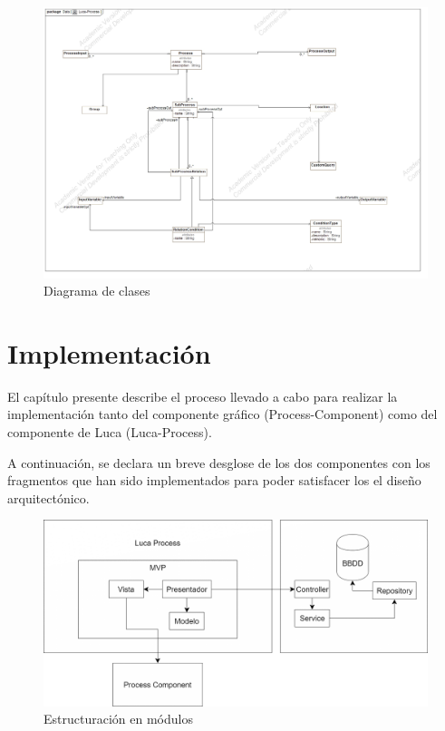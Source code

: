 \documentclass[a4paper,12pt]{book}
\begin{document}
		\begin{figure}[H]
			\centering
			\includegraphics[scale=0.35]{Luca-Process.jpg}
			\caption{Diagrama de clases}\label{fig:Luca-Process}
		\end{figure}
	
	\clearpage
	
	\chapter{Implementación}
	
	El capítulo presente describe el proceso llevado a cabo para realizar la implementación tanto del componente gráfico (Process-Component) como del componente de Luca (Luca-Process).
	
	\vspace{5mm}
	
	A continuación, se declara un breve desglose de los dos componentes con los fragmentos que han sido implementados para poder satisfacer los el diseño arquitectónico.
	
	\begin{figure}[H]
		\centering
		\includegraphics[scale=0.25]{esquema_proyecto.png}
		\caption{Estructuración en módulos}\label{fig:esquema_proyecto}
	\end{figure}
	
\end{document}
